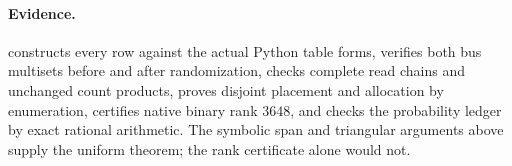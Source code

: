 \paragraph{Evidence.}  constructs every row against the actual Python table forms, verifies both bus multisets before and after randomization, checks complete read chains and unchanged count products, proves disjoint placement and allocation by enumeration, certifies native binary rank $3648$, and checks the probability ledger by exact rational arithmetic. The symbolic span and triangular arguments above supply the uniform theorem; the rank certificate alone would not.
